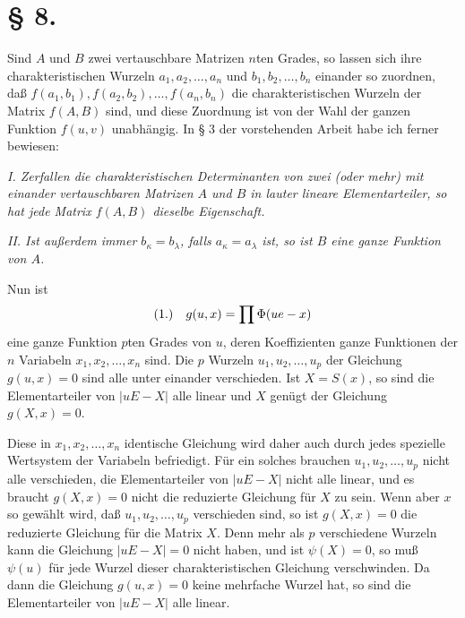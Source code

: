 \documentclass[11pt]{article}
\newcommand{\fnum}[1]{\textup{(\ensuremath{#1}.)}\quad}
\begin{document}
\section*{§ 8.}

Sind $A$ und $B$ zwei vertauschbare Matrizen $n$ten Grades, so lassen sich ihre charakteristischen Wurzeln $a_1,a_2,\ldots,a_n$ und $b_1,b_2,\ldots,b_n$ einander so zuordnen, daß $f(a_1,b_1),f(a_2,b_2),\ldots,f(a_n,b_n)$ die charakteristischen Wurzeln der Matrix $f(A,B)$ sind, und diese Zuordnung ist von der Wahl der ganzen Funktion $f(u,v)$ unabhängig. In § 3 der vorstehenden Arbeit habe ich ferner bewiesen:

\emph{I. Zerfallen die charakteristischen Determinanten von zwei (oder mehr) mit einander vertauschbaren Matrizen $A$ und $B$ in lauter lineare Elementarteiler, so hat jede Matrix $f(A,B)$ dieselbe Eigenschaft.}

\emph{II. Ist außerdem immer $b_\kappa=b_\lambda$, falls $a_\kappa=a_\lambda$ ist, so ist $B$ eine ganze Funktion von $A$.}

Nun ist
\[
\fnum{1} g(u,x)=\prod\Phi(ue-x)
\]
eine ganze Funktion $p$ten Grades von $u$, deren Koeffizienten ganze Funktionen der $n$ Variabeln $x_1,x_2,\ldots,x_n$ sind. Die $p$ Wurzeln $u_1,u_2,\ldots,u_p$ der Gleichung $g(u,x)=0$ sind alle unter einander verschieden. Ist $X=S(x)$, so sind die Elementarteiler von $|uE-X|$ alle linear und $X$ genügt der Gleichung $g(X,x)=0$.

Diese in $x_1,x_2,\ldots,x_n$ identische Gleichung wird daher auch durch jedes spezielle Wertsystem der Variabeln befriedigt. Für ein solches brauchen $u_1,u_2,\ldots,u_p$ nicht alle verschieden, die Elementarteiler von $|uE-X|$ nicht alle linear, und es braucht $g(X,x)=0$ nicht die reduzierte Gleichung für $X$ zu sein. Wenn aber $x$ so gewählt wird, daß $u_1,u_2,\ldots,u_p$ verschieden sind, so ist $g(X,x)=0$ die reduzierte Gleichung für die Matrix $X$. Denn mehr als $p$ verschiedene Wurzeln kann die Gleichung $|uE-X|=0$ nicht haben, und ist $\psi(X)=0$, so muß $\psi(u)$ für jede Wurzel dieser charakteristischen Gleichung verschwinden. Da dann die Gleichung $g(u,x)=0$ keine mehrfache Wurzel hat, so sind die Elementarteiler von $|uE-X|$ alle linear.
\end{document}
